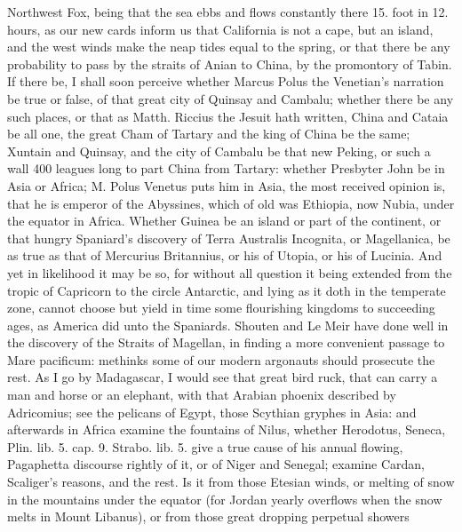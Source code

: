 {Northwest Fox, being that the sea ebbs and flows constantly there 15.
foot in 12. hours, as our new cards inform us that California is
not a cape, but an island, and the west winds make the neap tides equal
to the spring, or that there be any probability to pass by the straits
of Anian to China, by the promontory of Tabin. If there be, I shall
soon perceive whether Marcus Polus the Venetian's narration be
true or false, of that great city of Quinsay and Cambalu; whether there
be any such places, or that as Matth. Riccius the Jesuit hath
written, China and Cataia be all one, the great Cham of Tartary and the
king of China be the same; Xuntain and Quinsay, and the city of Cambalu
be that new Peking, or such a wall 400 leagues long to part China from
Tartary: whether Presbyter John be in Asia or Africa; M. Polus
Venetus puts him in Asia, the most received opinion is, that he
is emperor of the Abyssines, which of old was Ethiopia, now Nubia,
under the equator in Africa. Whether Guinea be an island or part
of the continent, or that hungry Spaniard's discovery of Terra
Australis Incognita, or Magellanica, be as true as that of Mercurius
Britannius, or his of Utopia, or his of Lucinia. And yet in likelihood
it may be so, for without all question it being extended from the
tropic of Capricorn to the circle Antarctic, and lying as it doth in
the temperate zone, cannot choose but yield in time some flourishing
kingdoms to succeeding ages, as America did unto the Spaniards. Shouten
and Le Meir have done well in the discovery of the Straits of Magellan,
in finding a more convenient passage to Mare pacificum: methinks some
of our modern argonauts should prosecute the rest. As I go by
Madagascar, I would see that great bird ruck, that can carry a
man and horse or an elephant, with that Arabian phoenix described by
Adricomius; see the pelicans of Egypt, those Scythian gryphes in
Asia: and afterwards in Africa examine the fountains of Nilus, whether
Herodotus, Seneca, Plin. lib. 5. cap. 9. Strabo. lib. 5. give a
true cause of his annual flowing, Pagaphetta discourse rightly of
it, or of Niger and Senegal; examine Cardan, Scaliger's reasons,
and the rest. Is it from those Etesian winds, or melting of snow in the
mountains under the equator (for Jordan yearly overflows when the snow
melts in Mount Libanus), or from those great dropping perpetual showers
}
